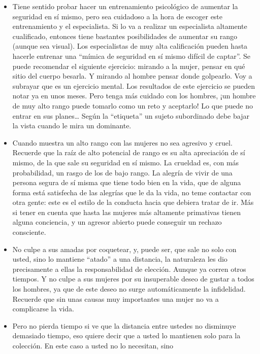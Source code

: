 \begin{itemize}
\tightlist
\item
  Tiene sentido probar hacer un entrenamiento psicológico de aumentar la
  seguridad en sí mismo, pero sea cuidadoso a la hora de escoger este
  entrenamiento y el especialista. Si lo va a realizar un especialista
  altamente cualificado, entonces tiene bastantes posibilidades de
  aumentar su rango (aunque sea visual). Los especialistas de muy alta
  calificación pueden hasta hacerle entrenar una ``mímica de seguridad
  en sí mismo difícil de captar''. Se puede recomendar el siguiente
  ejercicio: mirando a la mujer, pensar en qué sitio del cuerpo besarla.
  Y mirando al hombre pensar donde golpearlo. Voy a subrayar que es un
  ejercicio mental. Los resultados de este ejercicio se pueden notar ya
  en unos meses. Pero tenga más cuidado con los hombres, ¡un hombre de
  muy alto rango puede tomarlo como un reto y aceptarlo! Lo que puede no
  entrar en sus planes\ldots{} Según la ``etiqueta'' un sujeto
  subordinado debe bajar la vista cuando le mira un dominante.
\item
  Cuando muestra un alto rango con las mujeres no sea agresivo y cruel.
  Recuerde que la raíz de alto potencial de rango es su alta apreciación
  de sí mismo, de la que sale su seguridad en sí mismo. La crueldad es,
  con más probabilidad, un rasgo de los de bajo rango. La alegría de
  vivir de una persona segura de sí misma que tiene todo bien en la
  vida, que de alguna forma está satisfecha de las alegrías que le da la
  vida, no teme contactar con otra gente: este es el estilo de la
  conducta hacia que debiera tratar de ir. Más si tener en cuenta que
  hasta las mujeres más altamente primativas tienen alguna conciencia, y
  un agresor abierto puede conseguir un rechazo consciente.
\item
  No culpe a sus amadas por coquetear, y, puede ser, que sale no solo
  con usted, sino lo mantiene ``atado'' a una distancia, la naturaleza
  les dio precisamente a ellas la responsabilidad de elección. Aunque ya
  corren otros tiempos. Y no culpe a sus mujeres por su insuperable
  deseo de gustar a todos los hombres, ya que de este deseo no surge
  automáticamente la infidelidad. Recuerde que sin unas causas muy
  importantes una mujer no va a complicarse la vida.
\item
  Pero no pierda tiempo si ve que la distancia entre ustedes no
  disminuye demasiado tiempo, eso quiere decir que a usted lo mantienen
  solo para la colección. En este caso a usted no lo necesitan, sino

\end{itemize}
